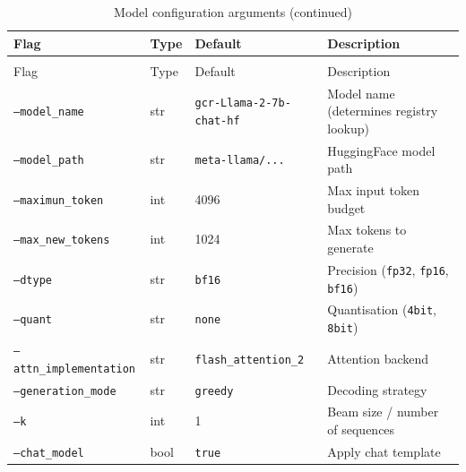\documentclass[11pt,a4paper,oneside,openany]{book}
\theoremstyle{definition}
\newcommand{\code}[1]{\texttt{#1}}
\begin{document}
\begin{longtable}{lp{3.5cm}p{2.5cm}p{6cm}}
	\caption{Model configuration arguments}
	\label{tab:cli-model}                                                                                                            \\
	\toprule
	Flag                          & Type & Default                         & Description                                             \\
	\midrule
	\endfirsthead
	\caption[]{Model configuration arguments (continued)}                                                                            \\
	\toprule
	Flag                          & Type & Default                         & Description                                             \\
	\midrule
	\endhead
	\bottomrule
	\endfoot
	\code{--model\_name}          & str  & \texttt{gcr-Llama-2-7b-chat-hf} & Model name (determines registry lookup)                 \\
	\code{--model\_path}          & str  & \texttt{meta-llama/...}         & HuggingFace model path                                  \\
	\code{--maximun\_token}       & int  & 4096                            & Max input token budget                                  \\
	\code{--max\_new\_tokens}     & int  & 1024                            & Max tokens to generate                                  \\
	\code{--dtype}                & str  & \texttt{bf16}                   & Precision (\texttt{fp32}, \texttt{fp16}, \texttt{bf16}) \\
	\code{--quant}                & str  & \texttt{none}                   & Quantisation (\texttt{4bit}, \texttt{8bit})             \\
	\code{--attn\_implementation} & str  & \texttt{flash\_attention\_2}    & Attention backend                                       \\
	\code{--generation\_mode}     & str  & \texttt{greedy}                 & Decoding strategy                                       \\
	\code{--k}                    & int  & 1                               & Beam size / number of sequences                         \\
	\code{--chat\_model}          & bool & \texttt{true}                   & Apply chat template                                     \\
\end{longtable}
\end{document}
